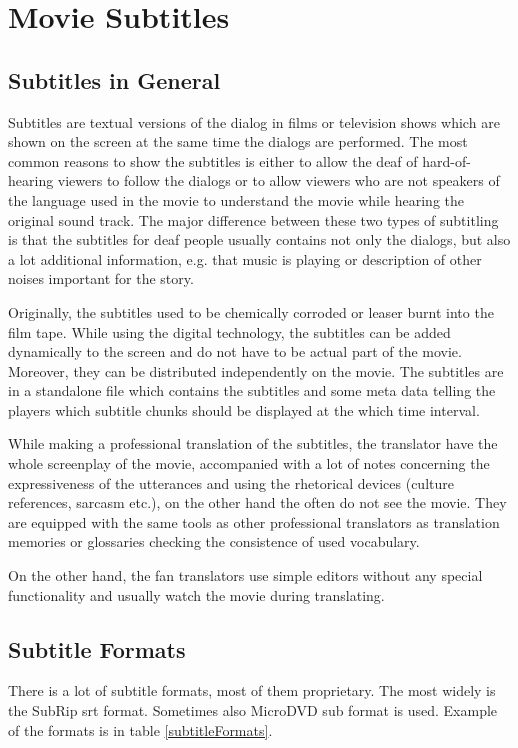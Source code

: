 \section{Movie Subtitles}
\subsection{Subtitles in General}

Subtitles are textual versions of the dialog in films or television shows which are shown on the screen at the same time the dialogs are performed. The most common reasons to show the subtitles is either to allow the deaf of hard-of-hearing viewers to follow the dialogs or to allow viewers who are not speakers of the language used in the movie to understand the movie while hearing the original sound track. The major difference between these two types of subtitling is that the subtitles for deaf people usually contains not only the dialogs, but also a lot additional information, e.g. that music is playing or description of other noises important for the story. 

Originally, the subtitles used to be chemically corroded or leaser burnt into the film tape. While using the digital technology, the subtitles can be added dynamically to the screen and do not have to be actual part of the movie. Moreover, they can be distributed independently on the movie. The subtitles are in a standalone file which contains the subtitles and some meta data telling the players which subtitle chunks should be displayed at the which time interval.

While making a professional translation of the subtitles, the translator have the whole screenplay of the movie, accompanied with a lot of notes concerning the expressiveness of the utterances and using the rhetorical devices (culture references, sarcasm etc.), on the other hand the often do not see the movie. They are equipped with the same tools as other professional translators as translation memories or glossaries checking the consistence of used vocabulary.

On the other hand, the fan translators use simple editors without any special functionality and usually watch the movie during translating.

\subsection{Subtitle Formats}
\label{subtitle_formats}

There is a lot of subtitle formats, most of them proprietary. The most widely is the SubRip srt format. Sometimes also MicroDVD sub format is used. Example of the formats is in table \ref{subtitleFormats}.

